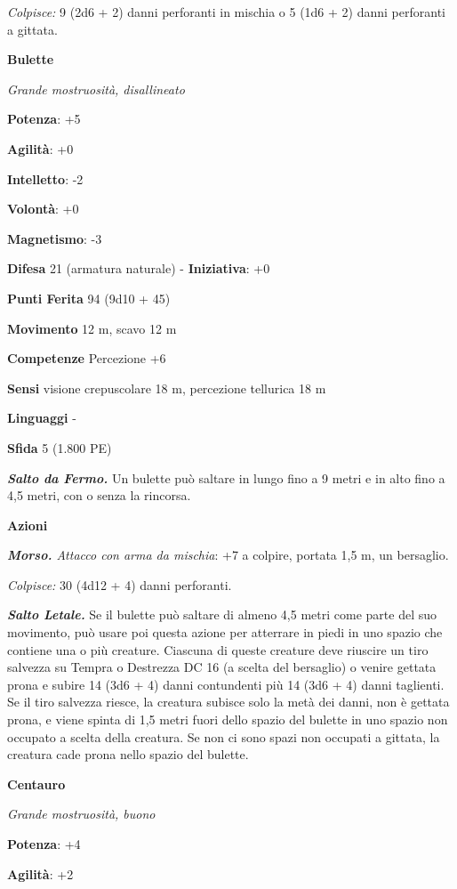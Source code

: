 \begin{multicols}{2}
\emph{Colpisce:} 9 (2d6 + 2) danni perforanti in mischia o 5 (1d6 + 2)
danni perforanti a gittata.

\textbf{Bulette}

\emph{Grande mostruosità, disallineato}

\textbf{Potenza}: +5

\textbf{Agilità}: +0

\textbf{Intelletto}: -2

\textbf{Volontà}: +0

\textbf{Magnetismo}: -3

\textbf{Difesa} 21 (armatura naturale) - \textbf{Iniziativa}: +0

\textbf{Punti Ferita} 94 (9d10 + 45)

\textbf{Movimento} 12 m, scavo 12 m

\textbf{Competenze} Percezione +6

\textbf{Sensi} visione crepuscolare 18 m, percezione tellurica 18 m

\textbf{Linguaggi} -

\textbf{Sfida} 5 (1.800 PE)

\emph{\textbf{Salto da Fermo.}} Un bulette può saltare in lungo fino a 9
metri e in alto fino a 4,5 metri, con o senza la rincorsa.

\textbf{Azioni}

\emph{\textbf{Morso.} Attacco con arma da mischia}: +7 a colpire,
portata 1,5 m, un bersaglio.

\emph{Colpisce:} 30 (4d12 + 4) danni perforanti.

\emph{\textbf{Salto Letale.}} Se il bulette può saltare di almeno 4,5
metri come parte del suo movimento, può usare poi questa azione per
atterrare in piedi in uno spazio che contiene una o più creature.
Ciascuna di queste creature deve riuscire un tiro salvezza su Tempra o
Destrezza DC 16 (a scelta del bersaglio) o venire gettata prona e subire
14 (3d6 + 4) danni contundenti più 14 (3d6 + 4) danni taglienti. Se il
tiro salvezza riesce, la creatura subisce solo la metà dei danni, non è
gettata prona, e viene spinta di 1,5 metri fuori dello spazio del
bulette in uno spazio non occupato a scelta della creatura. Se non ci
sono spazi non occupati a gittata, la creatura cade prona nello spazio
del bulette.

\textbf{Centauro}

\emph{Grande mostruosità, buono}

\textbf{Potenza}: +4

\textbf{Agilità}: +2


\end{multicols}

